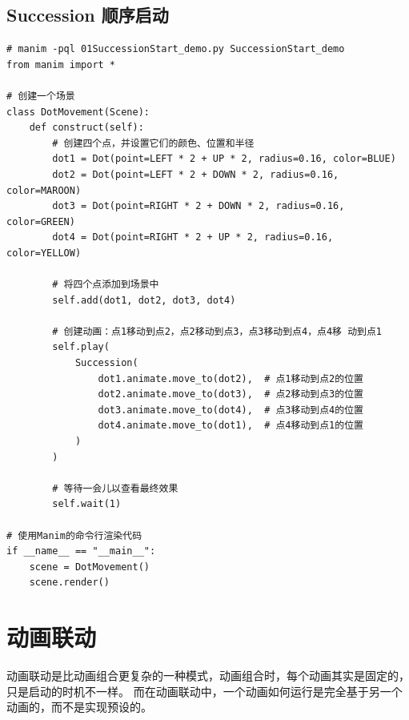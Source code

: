 \subsection{Succession 顺序启动}
\label{subsubsec:manim_animation_group_succession}
\begin{lstlisting}[style=pythonstyle]
# manim -pql 01SuccessionStart_demo.py SuccessionStart_demo
from manim import *

# 创建一个场景
class DotMovement(Scene):
    def construct(self):
        # 创建四个点，并设置它们的颜色、位置和半径
        dot1 = Dot(point=LEFT * 2 + UP * 2, radius=0.16, color=BLUE)
        dot2 = Dot(point=LEFT * 2 + DOWN * 2, radius=0.16, color=MAROON)
        dot3 = Dot(point=RIGHT * 2 + DOWN * 2, radius=0.16, color=GREEN)
        dot4 = Dot(point=RIGHT * 2 + UP * 2, radius=0.16, color=YELLOW)

        # 将四个点添加到场景中
        self.add(dot1, dot2, dot3, dot4)

        # 创建动画：点1移动到点2，点2移动到点3，点3移动到点4，点4移 动到点1
        self.play(
            Succession(
                dot1.animate.move_to(dot2),  # 点1移动到点2的位置
                dot2.animate.move_to(dot3),  # 点2移动到点3的位置
                dot3.animate.move_to(dot4),  # 点3移动到点4的位置
                dot4.animate.move_to(dot1),  # 点4移动到点1的位置
            )
        )

        # 等待一会儿以查看最终效果
        self.wait(1)

# 使用Manim的命令行渲染代码
if __name__ == "__main__":
    scene = DotMovement()
    scene.render()
\end{lstlisting}

\section{动画联动}
\label{sec:manim_animation_linkage}
动画联动是比动画组合更复杂的一种模式，动画组合时，每个动画其实是固定的，只是启动的时机不一样。
而在动画联动中，一个动画如何运行是完全基于另一个动画的，而不是实现预设的。

